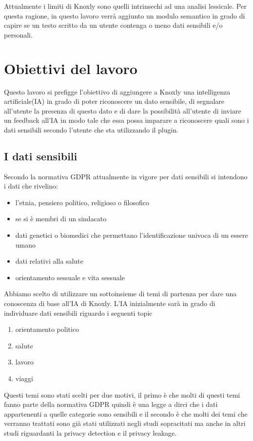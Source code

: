 Attualmente i limiti di Knoxly sono quelli intrinsechi ad una analisi lessicale. Per questa ragione, in questo lavoro verrà aggiunto un modulo semantico in grado di capire se un testo scritto da un utente contenga o meno dati sensibili e/o personali.

\section{Obiettivi del lavoro}
Questo lavoro si prefigge l'obiettivo di aggiungere a Knoxly una intelligenza artificiale(IA) in grado di poter riconoscere un dato sensibile, di segnalare all'utente la presenza di questo dato e di dare la possibilità all'utente di inviare un feedback all'IA in modo tale che essa possa imparare a riconoscere quali sono i dati sensibili secondo l'utente che sta utilizzando il plugin.
\subsection{I dati sensibili}
\label{ssec:sensitive_data}
Secondo la normativa GDPR attualmente in vigore per dati sensibili si intendono i dati che rivelino:
\begin{itemize}
    \item l'etnia, pensiero politico, religioso o filosofico
    \item se si è membri di un sindacato
    \item dati genetici o biomedici che permettano l'identificazione univoca di un essere umano
    \item dati relativi alla salute
    \item orientamento sessuale e vita sessuale
\end{itemize}
Abbiamo scelto di utilizzare un sottoinsieme di temi di partenza per dare una conoscenza di base all'IA di Knoxly. L'IA inizialmente sarà in grado di individuare dati sensibili riguardo i seguenti topic
\begin{enumerate}
    \item orientamento politico
    \item salute
    \item lavoro
    \item viaggi
\end{enumerate}
Questi temi sono stati scelti per due motivi, il primo è che molti di questi temi fanno parte della normativa GDPR quindi è una legge a dirci che i dati appartenenti a quelle categorie sono sensibili e il secondo è che molti dei temi che verranno trattati sono già stati utilizzati negli studi sopracitati ma anche in altri studi riguardanti la privacy detection e il privacy leakage.